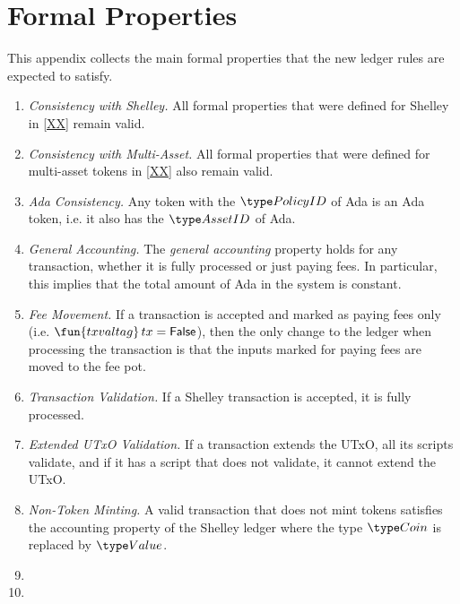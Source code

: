 \section{Formal Properties}
\label{sec:properties}

This appendix collects the main formal properties that the new ledger rules are expected to satisfy.

\begin{enumerate}[label=P{\arabic*}:\ ]
\item
  \emph{Consistency with Shelley.}
  All formal properties that were defined for Shelley in \ref{XX} remain valid.
\item
  \emph{Consistency with Multi-Asset.}
  All formal properties that were defined for multi-asset tokens in \ref{XX} also remain valid.
\item
  \emph{Ada Consistency.}
  Any token with the $\PolicyID$ of Ada is an Ada token, i.e. it
  also has the $\AssetID$ of Ada.
\item
  \emph{General Accounting.}
  The \emph{general accounting} property holds for any transaction,
  whether it is fully processed or just paying fees. In particular,
  this implies that the total amount of Ada in the system is constant.
\item
  \emph{Fee Movement.}
  If a transaction is accepted and marked as paying fees only
  (i.e. $\fun{txvaltag}\, tx = \False$), then the only change to the ledger
  when processing the transaction is that the inputs marked for paying
  fees are moved to the fee pot.
\item
  \emph{Transaction Validation.}
  If a Shelley transaction is accepted, it is fully processed.
\item
  \emph{Extended UTxO Validation.}
  If a transaction extends the UTxO, all its scripts validate, and
  if it has a script that does not validate, it cannot extend the
  UTxO.
\item
  \emph{Non-Token Minting.}
  A valid transaction that does not mint tokens satisfies the
  accounting property of the Shelley ledger where the type $\Coin$ is
  replaced by $\Value$.
\item
\item

\end{enumerate}
